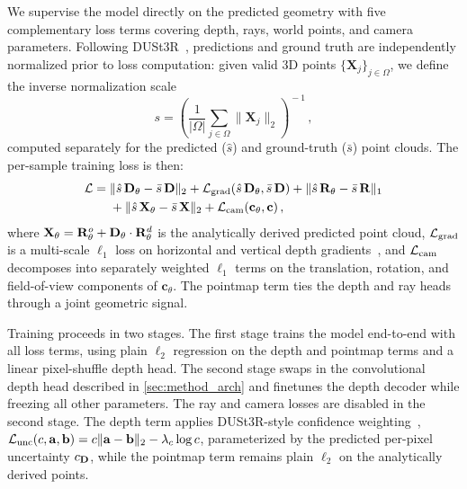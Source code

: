 We supervise the model directly on the predicted geometry with five complementary
loss terms
covering depth, rays, world points, and camera parameters.
Following DUSt3R~\citep{dust3r}, predictions and ground truth are independently normalized prior to loss computation: given valid 3D points $\{\mathbf{X}_j\}_{j \in \Omega}$, we define the inverse normalization scale
\begin{equation}
    s = \left(\frac{1}{|\Omega|} \sum_{j \in \Omega} \lVert \mathbf{X}_j \rVert_2\right)^{\!-1}\,,
\label{eq:normalization_scale}
\end{equation}
computed separately for the predicted ($\hat{s}$) and ground-truth ($\bar{s}$) point clouds.
The per-sample training loss is then:
\begin{equation}
\begin{split}
    \mathcal{L} ={} & \lVert \hat{s}\,\mathbf{D}_\theta - \bar{s}\,\mathbf{D} \rVert_2 + \mathcal{L}_\text{grad}(\hat{s}\,\mathbf{D}_\theta, \bar{s}\,\mathbf{D}) + \lVert \hat{s}\,\mathbf{R}_\theta - \bar{s}\,\mathbf{R} \rVert_1 \\
    & + \lVert \hat{s}\,\mathbf{X}_\theta - \bar{s}\,\mathbf{X} \rVert_2 + \mathcal{L}_\text{cam}(\mathbf{c}_\theta, \mathbf{c})\,,
\end{split}
\label{eq:total_loss}
\end{equation}
where $\mathbf{X}_\theta = \mathbf{R}_\theta^o + \mathbf{D}_\theta \cdot \mathbf{R}_\theta^d$ is the analytically derived predicted point cloud, $\mathcal{L}_\text{grad}$ is a multi-scale $\ell_1$ loss on horizontal and vertical depth gradients~\citep{Hu2019RevisitingSI, lin2025depth}, and $\mathcal{L}_\text{cam}$ decomposes into separately weighted $\ell_1$ terms on the translation, rotation, and field-of-view components of $\mathbf{c}_\theta$.
The pointmap term ties the depth and ray heads through a joint geometric signal. %



Training proceeds in two stages.
The first stage trains the model end-to-end with all loss terms, using plain $\ell_2$ regression on the depth and pointmap terms and a linear pixel-shuffle depth head.
The second stage swaps in the convolutional depth head described in \cref{sec:method_arch} and finetunes the depth decoder while freezing all other parameters. The ray and camera losses are disabled in the second stage. The depth term applies DUSt3R-style confidence weighting~\citep{dust3r}, $\mathcal{L}_\text{unc}(c, \mathbf{a}, \mathbf{b}) = c \lVert \mathbf{a} - \mathbf{b} \rVert_2 - \lambda_c \log c$, parameterized by the predicted per-pixel uncertainty $c_{\mathbf{D}}$, while the pointmap term remains plain $\ell_2$ on the analytically derived points.













